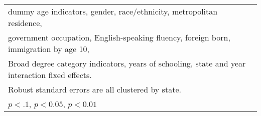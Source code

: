 \begin{table}[htbp]
\begin{tabular}{l*{3}{c}}
\multicolumn{4}{l}{\footnotesize dummy age indicators, gender, race/ethnicity, metropolitan residence,}\\
\multicolumn{4}{l}{\footnotesize government occupation, English-speaking fluency, foreign born, immigration by age 10,}\\
\multicolumn{4}{l}{\footnotesize Broad degree category indicators, years of schooling, state and year interaction fixed effects.}\\
\multicolumn{4}{l}{\footnotesize Robust standard errors are all clustered by state.}\\
\multicolumn{4}{l}{\footnotesize \sym{*} \(p<.1\), \sym{**} \(p<0.05\), \sym{***} \(p<0.01\)}\\
\end{tabular}
\end{table}

